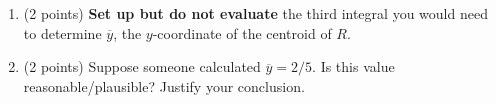 \documentclass[12pt]{article}
\begin{document}
\begin{enumerate}
\begin{enumerate}
	\vfill
	
	\vfill
	\item (2 points) \textbf{Set up but do not evaluate} the third integral you would need to determine $\overline{y}$, the $y$-coordinate of the centroid of $R.$ 
	\vfill
	\item (2 points) Suppose someone calculated $\overline{y} = 2/5.$ Is this value reasonable/plausible? Justify your conclusion.
	\vfill
	\end{enumerate}
\end{enumerate}
\end{document}
